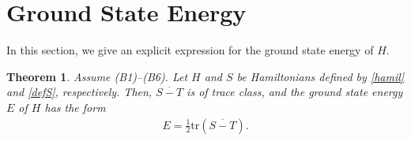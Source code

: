 \documentclass[12pt]{article}
\theoremstyle{plain}
\newtheorem{thm}[theorem]{\bf Theorem}
\numberwithin{equation}{section}
\theoremstyle{remark}
\begin{document}
\section{Ground State Energy}{\label{Sec:gse}}
In this section, we give an explicit expression for the ground state energy of $H$.

\begin{thm}\label{gse}
Assume (B1)--(B6). Let $H$ and $S$ be Hamiltonians defined by \eqref{hamil} and \eqref{defS}, respectively.
Then, $\overline{S-T}$ is of trace class, and the ground state energy $E$ of $H$ has the form
\begin{align}
  E = \frac{1}{2} \mathrm{tr}(\overline{S-T}). \label{eq:gse}
\end{align}
\end{thm}
\end{document}
